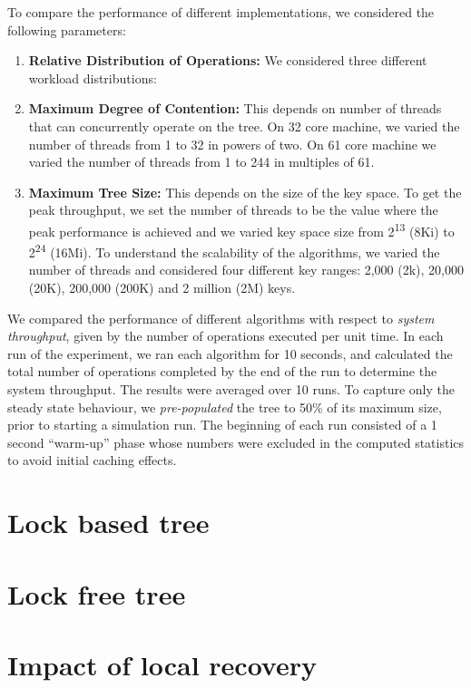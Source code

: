 To compare the performance of different implementations, we considered the following parameters:
\begin{enumerate}[leftmargin=*, noitemsep]
\item \textbf{Relative Distribution of Operations:} We considered three different workload  distributions: 
\item \textbf{Maximum Degree of Contention:} This depends on number of threads that can concurrently operate on the tree. On 32 core machine, we varied the number of threads 
from 1 to 32 in powers of two. On 61 core machine we varied the number of threads from 1 to 244 in multiples of 61.
\item \textbf{Maximum Tree Size:} This depends on the size of the key space. To get the peak throughput, we set the number of threads to be the value where the peak performance is achieved and we varied key space size from 2\textsuperscript{13} (8Ki) to 2\textsuperscript{24} (16Mi).  To understand the scalability of the algorithms, we varied the number of threads and considered four different key ranges: 2,000 (2k), 20,000 (20K), 200,000 (200K) and 2 million (2M) keys.
\end{enumerate}

We compared the performance of different algorithms with respect to \emph{system throughput}, given by the number of operations executed per unit time. In each run of the experiment, we ran each algorithm for 10 seconds, and calculated the total number of operations completed by the end of the run to determine the system throughput. The results were averaged over 10 runs. To capture only the steady state behaviour, we \textit{pre-populated} the tree to 50\% of its maximum size, prior to starting a simulation run. The beginning of each run consisted of a 1 second ``warm-up'' phase whose numbers were excluded in the computed statistics to avoid initial caching effects. 

\section{Lock based tree}
\label{sec:experiments:castle}

\section{Lock free tree}
\label{sec:experiments:icdcn}

\section{Impact of local recovery}
\label{sec:experiments:localRecovery}

%